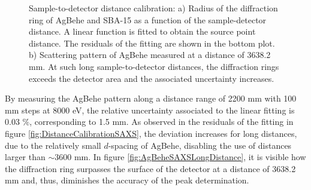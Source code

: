 \begin{figure}
	\centering
{}
		\caption[Sample-to-detector distance calibration and scattering pattern of AgBehe at large distance.]{Sample-to-detector distance calibration: a) Radius of the diffraction ring of AgBehe and SBA-15 as a function of the sample-detector distance. A linear function is fitted to obtain the source point distance. The residuals of the fitting are shown in the bottom plot. b) Scattering pattern of AgBehe measured at a distance of 3638.2 mm. At such long sample-to-detector distances, the diffraction rings exceeds the detector area and the associated uncertainty increases.}
\end{figure}

By measuring the AgBehe pattern along a distance range of 2200 mm with 100 mm steps at 8000 eV, the relative uncertainty associated to the linear fitting is 0.03 $\%$, corresponding to 1.5 mm. As observed in the residuals of the fitting in figure \ref{fig:DistanceCalibrationSAXS}, the deviation increases for long distances, due to the relatively small $d$-spacing of AgBehe, disabling the use of distances larger than $\sim 3600$ mm. In figure \ref{fig:AgBeheSAXSLongDistance}, it is visible how the diffraction ring surpasses the surface of the detector at a distance of 3638.2 mm and, thus, diminishes the accuracy of the peak determination.

